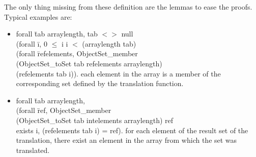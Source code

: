 The only thing missing from these definition are the lemmas to ease 
the proofs. Typical examples are: 
\begin{itemize}
\item
\btab
forall \=tab arraylength,
tab $<>$ null \rarrow \+\\
(forall \=i, 0 $\le$ i \conj i $<$ (arraylength tab) \rarrow \+\\
(forall \=refelements, ObjectSet\_member  \+\\
(ObjectSet\_toSet tab refelements arraylength) \\
(refelements tab i)). 
\etab
each element in the array  is a member of the corresponding set 
defined by the translation function.
\item
\btab
forall \=tab arraylength,\+\\
(forall \=ref,  ObjectSet\_member \+\\(ObjectSet\_toSet tab intelements arraylength)  ref
\rarrow \\
exists i, (refelements tab i) = ref). 
\etab
for each element of the result set of the translation, there exist an element in the 
array from which the set was translated.
\end{itemize}